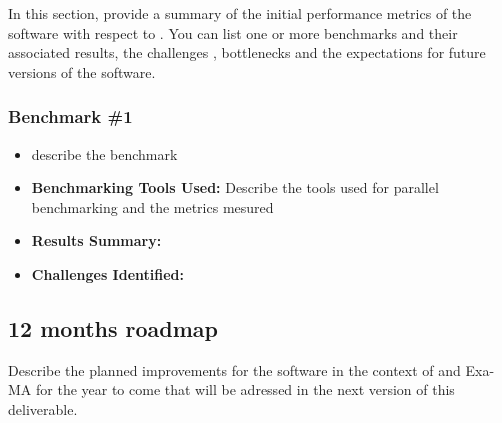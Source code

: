 In this section, provide a summary of the initial performance metrics of the software with respect to .
You can list one or more benchmarks and their associated results, the challenges , bottlenecks and the expectations for future versions of the software.



\subsubsection{Benchmark \#1}
\begin{itemize}
    \item describe the benchmark
    \item \textbf{Benchmarking Tools Used:} Describe the tools used for parallel benchmarking and the metrics mesured
    \item \textbf{Results Summary:} 
    \item \textbf{Challenges Identified:} 
\end{itemize}

\subsection{12 months roadmap}
\label{sec:\VAR{wp}:\VAR{software.name}:roadmap}

Describe the planned improvements  for the software in the context of  and Exa-MA for the year to come that will be adressed in the next version of this deliverable.
